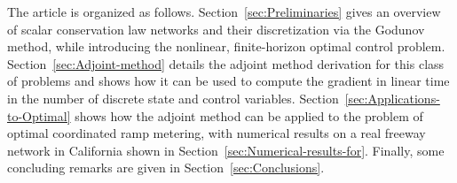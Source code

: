 The article is organized as follows. Section~\ref{sec:Preliminaries} gives an 
overview of scalar conservation law networks and their discretization via the 
Godunov method, while introducing the nonlinear, finite-horizon optimal control 
problem. Section~\ref{sec:Adjoint-method} details the adjoint method derivation 
for this class of problems and shows how it can be used to compute the gradient 
in linear time in the number of discrete state and control variables.  
Section~\ref{sec:Applications-to-Optimal} shows how the adjoint method can be 
applied to the problem of optimal coordinated ramp metering, with numerical 
results on a real freeway network in California shown in 
Section~\ref{sec:Numerical-results-for}. Finally, some concluding remarks are 
given in Section~\ref{sec:Conclusions}.

